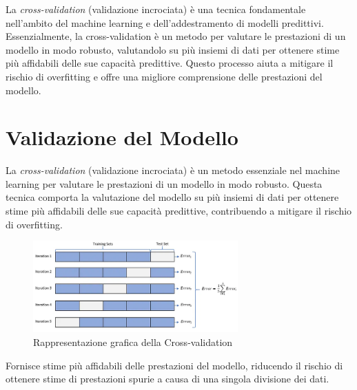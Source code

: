 La \textit{cross-validation} (validazione incrociata) è una tecnica
fondamentale nell'ambito del machine learning e dell'addestramento di modelli
predittivi. Essenzialmente, la cross-validation è un metodo per valutare le
prestazioni di un modello in modo robusto, valutandolo su più insiemi di dati
per ottenere stime più affidabili delle sue capacità predittive. Questo
processo aiuta a mitigare il rischio di overfitting e offre una migliore
comprensione delle prestazioni del modello.


\section{Validazione del Modello}
\label{sec:model_validation}

La \textit{cross-validation} (validazione incrociata) è un metodo essenziale nel machine learning
per valutare le prestazioni di un modello in modo robusto. Questa tecnica comporta la valutazione
del modello su più insiemi di dati per ottenere stime più affidabili delle sue capacità predittive,
contribuendo a mitigare il rischio di overfitting.

\begin{figure}[!ht]
	\centering
	\includegraphics[width=0.7\textwidth]{Immagini/cross_validation.png}
	\caption{Rappresentazione grafica della Cross-validation}
	\label{fig:cross_validation}
\end{figure}

Fornisce stime più affidabili delle prestazioni del modello, riducendo il
rischio di ottenere stime di prestazioni spurie a causa di una singola
divisione dei dati.
